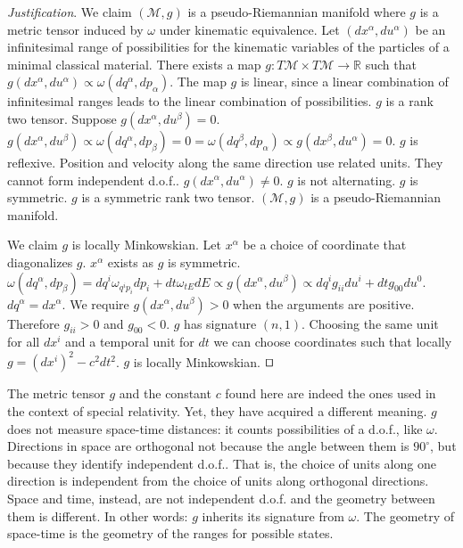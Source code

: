 \documentclass[smallextended]{svjour3}
\numberwithin{equation}{section}
\newenvironment{justification}{\emph{Justification}.}{\hfill\(\qed\)}
\begin{document}
\begin{justification}
	We claim $(\mathcal{M}, g)$ is a pseudo-Riemannian manifold where $g$ is a metric tensor induced by $\omega$ under kinematic equivalence. Let $(dx^\alpha, du^\alpha)$ be an infinitesimal range of possibilities for the kinematic variables of the particles of a minimal classical material. There exists a map $g : T\mathcal{M} \times T\mathcal{M} \rightarrow \mathbb{R}$ such that $g(dx^\alpha, du^\alpha) \propto \omega(dq^\alpha, dp_\alpha)$. The map $g$ is linear, since a linear combination of infinitesimal ranges leads to the linear combination of possibilities. $g$ is a rank two tensor. Suppose $g(dx^\alpha, du^\beta) = 0$. $g(dx^\alpha, du^\beta) \propto \omega(dq^\alpha, dp_\beta) = 0 = \omega(dq^\beta, dp_\alpha) \propto g(dx^\beta, du^\alpha) = 0$. $g$ is reflexive. Position and velocity along the same direction use related units. They cannot form independent d.o.f.. $g(dx^\alpha, du^\alpha) \neq 0$. $g$ is not alternating. $g$ is symmetric. $g$ is a symmetric rank two tensor. $(\mathcal{M}, g)$ is a pseudo-Riemannian manifold.
	
	We claim $g$ is locally Minkowskian. Let $x^\alpha$ be a choice of coordinate that diagonalizes $g$. $x^\alpha$ exists as $g$ is symmetric. $\omega(dq^\alpha, dp_\beta) = dq^i \omega_{q^ip_i} dp_i + dt \omega_{tE} dE \propto g(dx^\alpha, du^\beta) \propto dq^i g_{ii} du^i + dt g_{00} du^0$. $dq^\alpha = dx^\alpha$. We require $g(dx^\alpha, du^\beta)>0$ when the arguments are positive. Therefore $g_{ii} > 0$ and $g_{00} < 0$. $g$ has signature $(n, 1)$. Choosing the same unit for all $dx^i$ and a temporal unit for $dt$ we can choose coordinates such that locally $g = (dx^i)^2 - c^2 dt^2$. $g$ is locally Minkowskian.
\end{justification}

The metric tensor $g$ and the constant $c$ found here are indeed the ones used in the context of special relativity. Yet, they have acquired a different meaning. $g$ does not measure space-time distances: it counts possibilities of a d.o.f., like $\omega$. Directions in space are orthogonal not because the angle between them is $90^\circ$, but because they identify independent d.o.f.. That is, the choice of units along one direction is independent from the choice of units along orthogonal directions. Space and time, instead, are not independent d.o.f. and the geometry between them is different. In other words: $g$ inherits its signature from $\omega$. The geometry of space-time is the geometry of the ranges for possible states.
\end{document}
